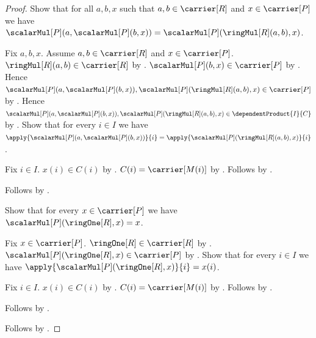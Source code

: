\begin{proof}
    Show that for all $a,b,x$ such that $a,b\in\carrier[R]$ and
        $x\in\carrier[P]$ we have
        $\scalarMul[P](a,\scalarMul[P](b,x))
            =\scalarMul[P](\ringMul[R](a,b),x)$.
    \begin{subproof}
        Fix $a,b,x$.
        Assume $a,b\in\carrier[R]$ and $x\in\carrier[P]$.
        $\ringMul[R](a,b)\in\carrier[R]$ by .
        $\scalarMul[P](b,x)\in\carrier[P]$ by
            .
        Hence
            $\scalarMul[P](a,\scalarMul[P](b,x)),
                \scalarMul[P](\ringMul[R](a,b),x)
            \in\carrier[P]$ by
            .
        Hence
            $\scalarMul[P](a,\scalarMul[P](b,x)),
                \scalarMul[P](\ringMul[R](a,b),x)
            \in\dependentProduct{I}{C}$ by \auto.
        Show that for every $i\in I$ we have
            $\apply{\scalarMul[P](a,\scalarMul[P](b,x))}{i}
                =\apply{\scalarMul[P](\ringMul[R](a,b),x)}{i}$.
        \begin{subproof}
            Fix $i\in I$.
            $x(i)\in C(i)$ by .
            $C(i)=\carrier[M(i)]$ by
                .
            Follows by
                .
        \end{subproof}
        Follows by .
    \end{subproof}

    Show that for every $x\in\carrier[P]$ we have
        $\scalarMul[P](\ringOne[R],x)=x$.
    \begin{subproof}
        Fix $x\in\carrier[P]$.
        $\ringOne[R]\in\carrier[R]$ by .
        $\scalarMul[P](\ringOne[R],x)\in\carrier[P]$ by
            .
        Show that for every $i\in I$ we have
            $\apply{\scalarMul[P](\ringOne[R],x)}{i}=x(i)$.
        \begin{subproof}
            Fix $i\in I$.
            $x(i)\in C(i)$ by .
            $C(i)=\carrier[M(i)]$ by
                .
            Follows by
                .
        \end{subproof}
        Follows by .
    \end{subproof}
    Follows by .
\end{proof}

